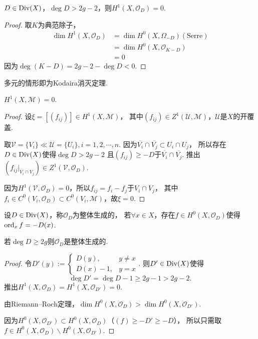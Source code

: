 \begin{theorem}
	$D\in \operatorname{Div}(X)$，$\deg D>2g-2$，则$H^1(X, \mathcal{O}_D)=0$.
\end{theorem}

\begin{proof}
	取$K$为典范除子，
	\begin{align*}
	\dim H^1(X, \mathcal{O}_D)&=\dim H^0(X, \Omega_{-D}) (\text{Serre})\\
	&=\dim H^0(X, \mathcal{O}_{K-D})\\
	&=0
	\end{align*}
	因为$\deg(K-D)=2g-2-\deg D<0$.
\end{proof}

\begin{remark}
	多元的情形即为Kodaira消灭定理.
\end{remark}

\begin{corollary}
	$H^1(X, \mathscr{M})=0$.
\end{corollary}

\begin{proof}
	设$\xi=[(f_{ij})]\in H^1(X, \mathscr{M})$，
    其中$(f_{ij})\in Z^1(\mathscr{U}, \mathscr{M})$，$\mathscr{U}$是$X$的开覆盖.

	取$\mathscr{V}=\{V_i\}\ll\mathscr{U}=\{U_i\}, i=1,2,\cdots,n$. 
    因为$\overline{V_i}\cap \overline{V_j}\subset U_i\cap U_j$，
    所以存在$D\in \operatorname{Div}(X)$使得$\deg D>2g-2$
    且$(f_{ij})\geq -D$于$\overline{V_i}\cap \overline{V_j}$. 
    推出$(f_{ij}|_{V_i\cap V_j})\in Z^1(\mathscr{V}, \mathcal{O}_D)$.\par
	因为$H^1(\mathscr{V}, \mathcal{O}_D)=0$，所以$f_{ij}=f_i-f_j$于$V_i\cap V_j$，
    其中$f_i\in C^0(V_i,\mathcal{O}_D)\subset C^0(V_i, \mathscr{M})$，故$\xi=0$.
\end{proof}

\begin{definition}
	设$D\in \operatorname{Div}(X)$，称$\mathcal{O}_D$为整体生成的，
    若$\forall x\in X$，存在$f\in H^0(X,\mathcal{O}_D)$使得$\operatorname{ord}_x f=-D(x)$.
\end{definition}

\begin{theorem}
	若$\deg D\geq 2g$则$\mathcal{O}_D$是整体生成的.
\end{theorem}

\begin{proof}
	令$D'(y):=\begin{cases} D(y), &y\neq x\\ D(x)-1, &y=x\end{cases}$. 
    则$D'\in \operatorname{Div}(X)$使得
    \[\deg D'=\deg D-1\geq2g-1> 2g-2.\]
    推出$H^1(X,\mathcal{O}_D)=H^1(X, \mathcal{O}_{D'})=0$.

	由Riemann--Roch定理，$\dim H^0(X, \mathcal{O}_D)> \dim H^0(X, \mathcal{O}_{D'})$.

	因为$H^0(X, \mathcal{O}_{D'})\subset H^0(X, \mathcal{O}_D)$（$(f)\geq -D'\geq -D$），
    所以只需取$f\in H^0(X, \mathcal{O}_D)\backslash H^0(X, \mathcal{O}_{D'})$.
\end{proof}

